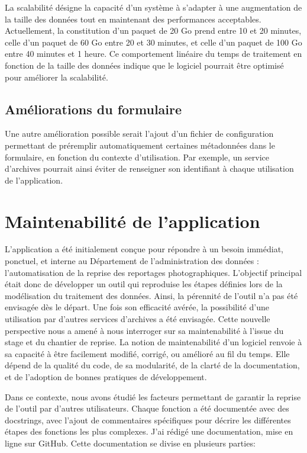 La scalabilité désigne la capacité d'un système à s'adapter à une augmentation de la taille des données tout en maintenant des performances acceptables. Actuellement, la constitution d’un paquet de 20 Go prend entre 10 et 20 minutes, celle d’un paquet de 60 Go entre 20 et 30 minutes, et celle d’un paquet de 100 Go entre 40 minutes et 1 heure. Ce comportement linéaire du temps de traitement en fonction de la taille des données indique que le logiciel pourrait être optimisé pour améliorer la scalabilité.

\subsection*{Améliorations du formulaire}

Une autre amélioration possible serait l'ajout d'un fichier de configuration permettant de préremplir automatiquement certaines métadonnées dans le formulaire, en fonction du contexte d'utilisation. Par exemple, un service d'archives pourrait ainsi éviter de renseigner son identifiant à chaque utilisation de l'application.


\section{Maintenabilité de l'application}
L'application a été initialement conçue pour répondre à un besoin immédiat, ponctuel, et interne au Département de l'administration des données : l'automatisation de la reprise des reportages photographiques. L'objectif principal était donc de développer un outil qui reproduise les étapes définies lors de la modélisation du traitement des données. Ainsi, la pérennité de l'outil n'a pas été envisagée dès le départ. Une fois son efficacité avérée, la possibilité d'une utilisation par d'autres services d'archives a été envisagée. Cette nouvelle perspective nous a amené à nous interroger sur sa maintenabilité à l'issue du stage et du chantier de reprise. La notion de maintenabilité d'un logiciel renvoie à sa capacité à être facilement modifié, corrigé, ou amélioré au fil du temps. Elle dépend de la qualité du code, de sa modularité, de la clarté de la documentation, et de l'adoption de bonnes pratiques de développement.

Dans ce contexte, nous avons étudié les facteurs permettant de garantir la reprise de l'outil par d'autres utilisateurs. Chaque fonction a été documentée avec des \gls{docstrings}, avec l'ajout de commentaires spécifiques pour décrire les différentes étapes des fonctions les plus complexes. J'ai rédigé une documentation, mise en ligne sur GitHub. Cette documentation se divise en plusieurs parties: 

